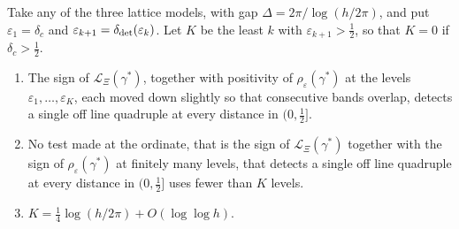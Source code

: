 \begin{corollary}\label{tf:cor:levels}
Take any of the three lattice models, with gap $\Delta=2\pi/\log(h/2\pi)$, and put $\varepsilon_1=\delta_c$ and $\varepsilon_{k+1}=\delta_{\rm det}(\varepsilon_k)$. Let $K$ be the least $k$ with $\varepsilon_{k+1}>\tfrac12$, so that $K=0$ if $\delta_c>\tfrac12$.
\begin{enumerate}
\item[(a)] The sign of $\mathcal L_\Xi(\gamma^*)$, together with positivity of $\rho_\varepsilon(\gamma^*)$ at the levels $\varepsilon_1,\dots,\varepsilon_K$, each moved down slightly so that consecutive bands overlap, detects a single off line quadruple at every distance in $(0,\tfrac12]$.
\item[(b)] No test made at the ordinate, that is the sign of $\mathcal L_\Xi(\gamma^*)$ together with the sign of $\rho_\varepsilon(\gamma^*)$ at finitely many levels, that detects a single off line quadruple at every distance in $(0,\tfrac12]$ uses fewer than $K$ levels.
\item[(c)] $K=\tfrac14\log(h/2\pi)+O(\log\log h)$.
\end{enumerate}
\end{corollary}

